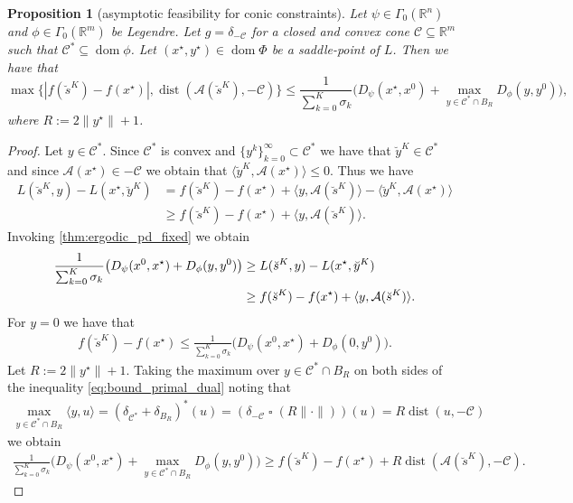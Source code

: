 \documentclass[10pt,a4paper]{amsart}
\newtheorem{proposition}{Proposition}
\newcommand{\bR}{\mathbb{R}}
\newcommand{\cC}{\mathcal{C}}
\DeclareMathOperator{\dist}{dist}
\DeclareMathOperator{\dom}{dom}
\DeclareMathOperator{\infconv}{\mathbin{\square}}
\begin{document}
\begin{proposition}[asymptotic feasibility for conic constraints]
Let $\psi \in \Gamma_0(\bR^n)$ and $\phi \in \Gamma_0(\bR^m)$ be Legendre. Let $g=\delta_{-\cC}$ for a closed and convex cone $\mathcal{C} \subseteq \bR^m$ such that $\cC^* \subseteq \dom \phi$. Let $(x^\star, y^\star) \in \dom \Phi$ be a saddle-point of $L$.
Then we have that
$$
\max\{|f(\breve s^K) - f(x^\star)|, \dist(\mathcal{A}(\breve s^K), -\cC)\} \leq \frac{1}{\sum_{k=0}^{K} \sigma_k} \big(D_\psi(x^\star,x^0) + \max_{y \in \cC^* \cap B_R} D_\phi(y, y^0)\big),
$$
where $R:=2\|y^\star\| + 1$.
\end{proposition}

\begin{proof}
Let $y \in \cC^*$. Since $\cC^*$ is convex and $\{y^{k}\}_{k=0}^\infty \subset \cC^*$ we have that $\breve y^{K} \in \cC^*$ and since $\mathcal{A}(x^\star) \in -\cC$ we obtain that $\langle \breve y^{K}, \mathcal{A}(x^\star) \rangle \leq 0$. Thus we have
\begin{align*}
L(\breve s^K, y) - L(x^\star, \breve y^K) &= f(\breve s^K) - f(x^\star) + \langle y, \mathcal{A}(\breve s^K)\rangle - \langle \breve y^{K}, \mathcal{A}(x^\star) \rangle \\
&\geq f(\breve s^K) - f(x^\star) + \langle y, \mathcal{A}(\breve s^K)\rangle.
\end{align*}
Invoking \cref{thm:ergodic_pd_fixed} we obtain
\begin{align}
\frac{1}{\sum_{k=0}^{K} \sigma_k} \big(D_\psi(x^0,x^\star) + D_\phi(y, y^0)\big) &\geq L(\breve s^K, y) - L(x^\star, \breve y^K) \notag \\
&\geq f(\breve s^K) - f(x^\star) + \langle y, \mathcal{A}(\breve s^K)\rangle\label{eq:bound_primal_dual}.
\end{align}
For $y =0$ we have that
\begin{align} \label{eq:ergodic_simple}
    f(\breve s^K) - f(x^\star) \leq \frac{1}{\sum_{k=0}^{K} \sigma_k} \big(D_\psi(x^0,x^\star) + D_\phi(0, y^0)\big).
\end{align}
Let $R:= 2\|y^\star\| + 1$.
Taking the maximum over $y \in \cC^* \cap B_R$ on both sides of the inequality \cref{eq:bound_primal_dual} noting that
\begin{align*}
\max_{y \in \cC^* \cap B_R} \langle y, u\rangle = (\delta_{\cC^*} + \delta_{B_R})^*(u)  =(\delta_{-\cC} \infconv (R\|\cdot\|))(u) =R \dist(u,-\cC)
\end{align*}
we obtain
\begin{align}
    \frac{1}{\sum_{k=0}^{K} \sigma_k} \big(D_\psi(x^0,x^\star) + \max_{y \in \cC^* \cap B_R} D_\phi(y, y^0)\big) \geq f(\breve s^K) - f(x^\star) + R \dist(\mathcal{A}(\breve s^K), -\cC).\label{eq:ergodic_1}

\end{align}
\end{proof}
\end{document}
